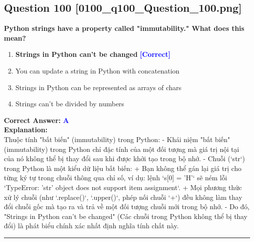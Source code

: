 \documentclass[11pt,a4paper]{article}
\begin{document}
\begin{minipage}{\textwidth}
\subsection*{Question 100 \quad \footnotesize{[0100_q100_Question_100.png]}}
\noindent \textbf{Python strings have a property called "immutability." What does this mean?}

\begin{enumerate}[label=\Alph*.]
    \item \textbf{Strings in Python can't be changed} \hfill \textcolor{blue}{\textbf{[Correct]}}
    \item You can update a string in Python with concatenation
    \item Strings in Python can be represented as arrays of chars
    \item Strings can't be divided by numbers
\end{enumerate}

\noindent \textbf{Correct Answer:} \textcolor{blue}{\textbf{A}} \\[4pt]
\noindent \textbf{Explanation:}\\
Thuộc tính "bất biến" (immutability) trong Python:\newline
- Khái niệm "bất biến" (immutability) trong Python chỉ đặc tính của một đối tượng mà giá trị nội tại của nó không thể bị thay đổi sau khi được khởi tạo trong bộ nhớ.\newline
- Chuỗi (`str`) trong Python là một kiểu dữ liệu bất biến:\newline
  + Bạn không thể gán lại giá trị cho từng ký tự trong chuỗi thông qua chỉ số, ví dụ: lệnh `s[0] = 'H'` sẽ ném lỗi `TypeError: 'str' object does not support item assignment`.\newline
  + Mọi phương thức xử lý chuỗi (như `.replace()`, `.upper()`, phép nối chuỗi `+`) đều không làm thay đổi chuỗi gốc mà tạo ra và trả về một đối tượng chuỗi mới trong bộ nhớ.\newline
- Do đó, "Strings in Python can't be changed" (Các chuỗi trong Python không thể bị thay đổi) là phát biểu chính xác nhất định nghĩa tính chất này.
\end{minipage}
\vspace{0.8cm}
\hrule
\vspace{0.5cm}
\end{document}
